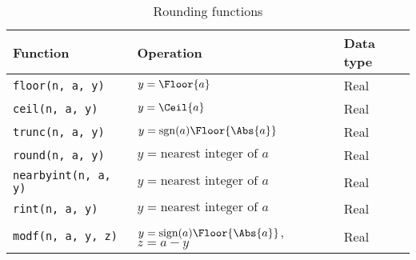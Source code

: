 \begin{table}
  \begin{tabularx}{\textwidth}{LLL}
    \toprule
    Function & Operation & Data type \\
    \midrule
    \texttt{floor(n, a, y)} & $y = \Floor{a}$                       & Real \\
    \texttt{ceil(n, a, y)}  & $y = \Ceil{a}$                        & Real \\
    \texttt{trunc(n, a, y)} & $y = \mathrm{sgn}(a)\Floor{\Abs{a}}$  & Real \\
    \texttt{round(n, a, y)} & $y = \text{nearest integer of }a$     & Real \\
    \texttt{nearbyint(n, a, y)} & $y = \text{nearest integer of }a$ & Real \\
    \texttt{rint(n, a, y)}  & $y = \text{nearest integer of }a$     & Real \\
    \texttt{modf(n, a, y, z)} &
    $y = \mathrm{sign}(a)\Floor{\Abs{a}}$, $z = a - y$ & Real \\
    \bottomrule
  \end{tabularx}
  \caption{Rounding functions}
  \label{tab:Rounding functions}
\end{table}

\clearpage
